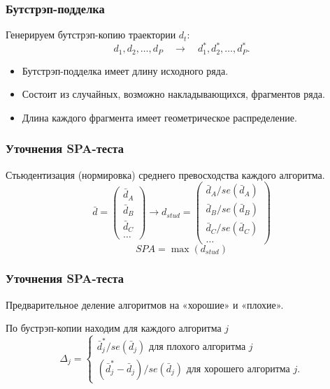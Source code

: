 \begin{frame}
    \frametitle{Бутстрэп-подделка}

    Генерируем \alert{бутстрэп-копию} траектории $d_t$: 
        \[
        d_1, d_2, \ldots, d_P  \quad \to \quad     d_1^*, d_2^*, \ldots, d_P^*.
        \] \pause
    \begin{itemize}
        \item Бутстрэп-подделка имеет длину исходного ряда.\pause 
        \item Состоит из случайных, возможно накладывающихся, \alert{фрагментов} ряда. \pause 
        \item Длина каждого фрагмента имеет \alert{геометрическое} распределение. 
    \end{itemize}
\end{frame}




\begin{frame}
    \frametitle{Уточнения SPA-теста}


    \alert{Стьюдентизация} (нормировка) среднего превосходства каждого алгоритма. 
        \[
        \bar d = \begin{pmatrix}
            \bar d_A \\
            \bar d_B \\
            \bar d_C \\
            \ldots 
        \end{pmatrix}     \to 
        d_{stud} = \begin{pmatrix}
            \bar d_A / se(\bar d_A) \\
            \bar d_B / se(\bar d_B) \\
            \bar d_C / se(\bar d_C) \\
            \ldots 
        \end{pmatrix}        
        \] \pause
        \[
        SPA = \max(d_{stud})    
        \]
\end{frame}


\begin{frame}
    \frametitle{Уточнения SPA-теста}

    \alert{Предварительное деление} алгоритмов на «хорошие» и «плохие». \pause

    По бустрэп-копии находим для каждого алгоритма $j$
    \[
        \Delta_j = \begin{cases}
            \bar d^*_j / se(\bar d_j) \text{ для плохого алгоритма } j\\
            (\bar d^*_j - \bar d_j)/ se(\bar d_j) \text{ для хорошего алгоритма }j.
        \end{cases}
    \]
\end{frame}



